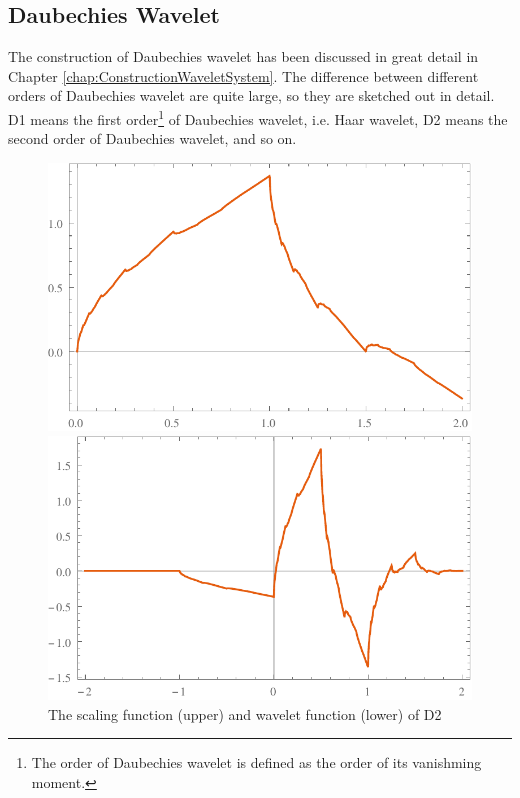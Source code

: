 \documentclass{book}
\begin{document}
\subsection{Daubechies Wavelet}

The construction of Daubechies wavelet has been discussed in great detail in
Chapter \ref{chap:ConstructionWaveletSystem}. The difference between different
orders of Daubechies wavelet are quite large, so they are sketched out in
detail. D1 means the first order\footnote{The order of Daubechies wavelet is
defined as the order of its vanishming moment.} of Daubechies wavelet, i.e.
Haar wavelet, D2 means the second order of Daubechies wavelet, and so on.

\begin{figure}[h]
  \includegraphics{Figures/D2WaveletPhi.pdf}
  
  \includegraphics{Figures/D2WaveletPsi.pdf}
  \caption{The scaling function (upper) and wavelet function (lower) of D2}
\end{figure}
\end{document}
